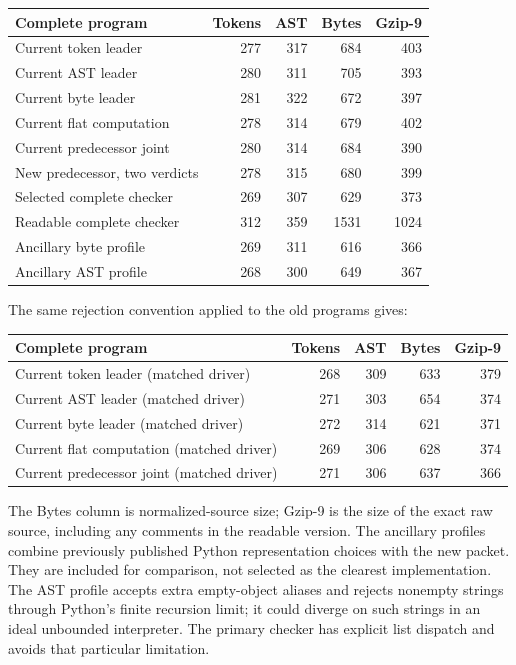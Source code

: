 \documentclass[11pt,letterpaper]{article}
\theoremstyle{definition}\newtheorem{definition}[theorem]{Definition}
\theoremstyle{remark}\newtheorem{remark}[theorem]{Remark}
\begin{document}
\begin{center}\small
\begin{tabular}{lrrrr}
\toprule
Complete program & Tokens & AST & Bytes & Gzip-9\\
\midrule
Current token leader & 277 & 317 & 684 & 403\\
Current AST leader & 280 & 311 & 705 & 393\\
Current byte leader & 281 & 322 & 672 & 397\\
Current flat computation & 278 & 314 & 679 & 402\\
Current predecessor joint & 280 & 314 & 684 & 390\\
New predecessor, two verdicts & 278 & 315 & 680 & 399\\
Selected complete checker & 269 & 307 & 629 & 373\\
Readable complete checker & 312 & 359 & 1531 & 1024\\
Ancillary byte profile & 269 & 311 & 616 & 366\\
Ancillary AST profile & 268 & 300 & 649 & 367\\
\bottomrule
\end{tabular}
\end{center}

The same rejection convention applied to the old programs gives:

\begin{center}\small
\begin{tabular}{lrrrr}
\toprule
Complete program & Tokens & AST & Bytes & Gzip-9\\
\midrule
Current token leader (matched driver) & 268 & 309 & 633 & 379\\
Current AST leader (matched driver) & 271 & 303 & 654 & 374\\
Current byte leader (matched driver) & 272 & 314 & 621 & 371\\
Current flat computation (matched driver) & 269 & 306 & 628 & 374\\
Current predecessor joint (matched driver) & 271 & 306 & 637 & 366\\
\bottomrule
\end{tabular}
\end{center}



The Bytes column is normalized-source size; Gzip-9 is the size of the
exact raw source, including any comments in the readable version. The
ancillary profiles combine previously published Python representation
choices with the new packet. They are included for comparison, not
selected as the clearest implementation. The AST profile accepts extra
empty-object aliases and rejects nonempty strings through Python's finite
recursion limit; it could diverge on such strings in an ideal unbounded
interpreter. The primary checker has explicit list dispatch and avoids
that particular limitation.
\end{document}
